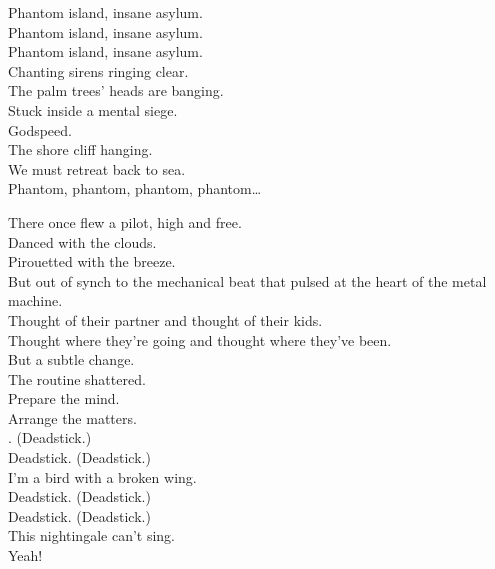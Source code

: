 Phantom island, insane asylum. \\
Phantom island, insane asylum. \\
Phantom island, insane asylum. \\
Chanting sirens ringing clear. \\

The palm trees' heads are banging. \\
Stuck inside a mental siege. \\
Godspeed. \\
The shore cliff hanging. \\
We must retreat back to sea. \\

Phantom, phantom, phantom, phantom… \\





There once flew a pilot, high and free. \\
Danced with the clouds. \\
Pirouetted with the breeze. \\
But out of synch to the mechanical beat that pulsed at the heart of the metal machine. \\
Thought of their partner and thought of their kids. \\
Thought where they're going and thought where they've been. \\
But a subtle change. \\
The routine shattered. \\
Prepare the mind. \\
Arrange the matters. \\

. (Deadstick.) \\
Deadstick. (Deadstick.) \\
I'm a bird with a broken wing. \\
Deadstick. (Deadstick.) \\
Deadstick. (Deadstick.) \\
This nightingale can't sing. \\
Yeah! \\


